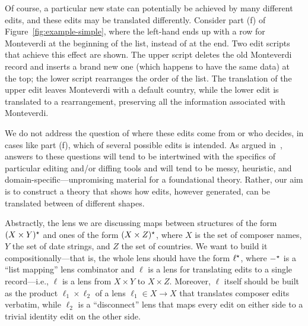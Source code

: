 Of course, a particular new \replica state can potentially be
achieved by many different edits, and these edits may be translated differently.
%
Consider part (f) of Figure~\ref{fig:example-simple}, where the left-hand
\replica ends up with a row for {\sf Monteverdi} at the beginning of the
list, instead of at the end. Two edit scripts that achieve this
effect are shown. The upper script deletes
the old {\sf Monteverdi} record and inserts a brand new one (which happens
to have 
the same data) at the top; the lower script rearranges the order of the
list.  The translation of the upper edit leaves {\sf Monteverdi} with a
default country, while the lower edit is translated to a
rearrangement, preserving all the information associated with {\sf
  Monteverdi}.%

We do not address the question of where these edits come from or who
decides, in cases like part (f), which of several possible edits is
intended.  As argued in~\cite{Matching10}, answers to these questions will
tend to be intertwined with the specifics of particular editing and/or
diffing tools and will tend to be messy, heuristic, and
domain-specific---unpromising material for a foundational theory.  Rather,
our aim is to construct a theory that shows how edits, however
generated, can be translated between \replicas of different shapes.

\iflater{}\fi

Abstractly, the lens we are discussing maps between structures of the form
$(X \times Y)^\star$ and ones of the form $(X \times Z)^\star$, where $X$ is the set
of composer names, $Y$ the set of date strings, and $Z$ the set of
countries.  We want to build it compositionally---that is, the whole lens
should have the form $\ell^\star$, where $-^\star$ is a ``list mapping'' lens
combinator and $\ell$ is a lens for translating edits to a
single record---i.e., $\ell$ is a lens from $X \times Y$ to $X \times Z$.
Moreover, $\ell$ itself should be built as the product $\ell_1 \times
\ell_2$ of a lens $\ell_1 \in X \to X$ that translates composer edits
verbatim, while $\ell_2$ is a ``disconnect'' lens that maps every edit on
either side to a trivial identity edit on the other side.

